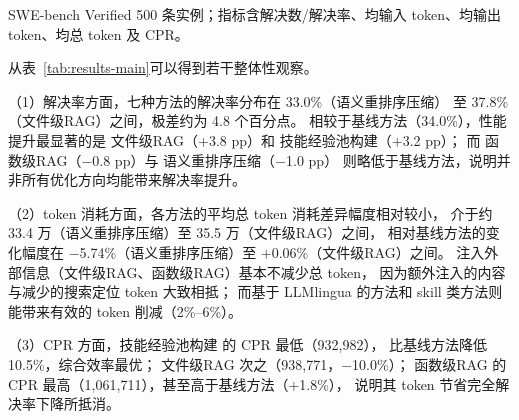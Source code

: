 \begin{table}[htbp]
  \centering
  \caption{七种方法总体实验结果}
  {\footnotesize SWE-bench Verified 500 条实例；指标含解决数/解决率、均输入 token、均输出 token、均总 token 及 CPR。}
  \label{tab:results-main}
\end{table}

从表~\ref{tab:results-main}可以得到若干整体性观察。

（1）解决率方面，七种方法的解决率分布在 33.0\%（语义重排序压缩）
至 37.8\%（文件级RAG）之间，极差约为 4.8 个百分点。
相较于基线方法（34.0\%），性能提升最显著的是
文件级RAG（+3.8 pp）和 技能经验池构建（+3.2 pp）；
而 函数级RAG（$-$0.8 pp）与 语义重排序压缩（$-$1.0 pp）
则略低于基线方法，说明并非所有优化方向均能带来解决率提升。

（2）token 消耗方面，各方法的平均总 token 消耗差异幅度相对较小，
介于约 33.4 万（语义重排序压缩）至 35.5 万（文件级RAG）之间，
相对基线方法的变化幅度在 $-$5.74\%（语义重排序压缩）至
$+$0.06\%（文件级RAG）之间。
注入外部信息（文件级RAG、函数级RAG）基本不减少总 token，
因为额外注入的内容与减少的搜索定位 token 大致相抵；
而基于 LLMlingua 的方法和 skill 类方法则能带来有效的 token 削减（2\%–6\%）。

（3）CPR 方面，技能经验池构建 的 CPR 最低（932,982），
比基线方法降低 10.5\%，综合效率最优；
文件级RAG 次之（938,771，$-$10.0\%）；
函数级RAG 的 CPR 最高（1,061,711），甚至高于基线方法（$+$1.8\%），
说明其 token 节省完全解决率下降所抵消。

